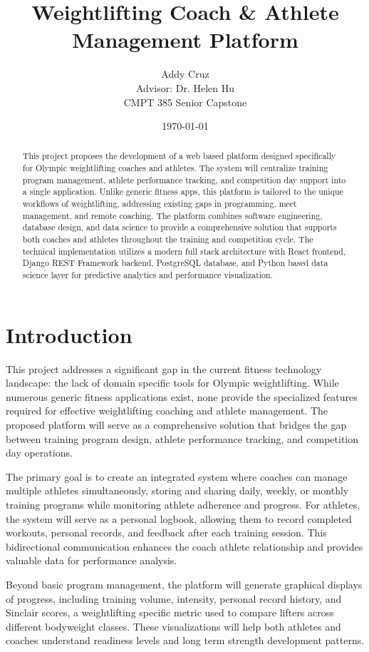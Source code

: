 \documentclass[11pt, oneside]{article}   	%
\title{Weightlifting Coach \& Athlete Management Platform}
\author{Addy Cruz \\ Advisor: Dr. Helen Hu \\ CMPT 385 Senior Capstone}
\date{\today}
\begin{document}
\maketitle

\begin{abstract}
\noindent
This project proposes the development of a web based platform designed specifically for Olympic weightlifting coaches and athletes. The system will centralize training program management, athlete performance tracking, and competition day support into a single application. Unlike generic fitness apps, this platform is tailored to the unique workflows of weightlifting, addressing existing gaps in programming, meet management, and remote coaching. The platform combines software engineering, database design, and data science to provide a comprehensive solution that supports both coaches and athletes throughout the training and competition cycle. The technical implementation utilizes a modern full stack architecture with React frontend, Django REST Framework backend, PostgreSQL database, and Python based data science layer for predictive analytics and performance visualization.
\end{abstract}

\section*{Introduction}

This project addresses a significant gap in the current fitness technology landscape: the lack of domain specific tools for Olympic weightlifting. While numerous generic fitness applications exist, none provide the specialized features required for effective weightlifting coaching and athlete management. The proposed platform will serve as a comprehensive solution that bridges the gap between training program design, athlete performance tracking, and competition day operations.

The primary goal is to create an integrated system where coaches can manage multiple athletes simultaneously, storing and sharing daily, weekly, or monthly training programs while monitoring athlete adherence and progress. For athletes, the system will serve as a personal logbook, allowing them to record completed workouts, personal records, and feedback after each training session. This bidirectional communication enhances the coach athlete relationship and provides valuable data for performance analysis.

Beyond basic program management, the platform will generate graphical displays of progress, including training volume, intensity, personal record history, and Sinclair scores, a weightlifting specific metric used to compare lifters across different bodyweight classes. These visualizations will help both athletes and coaches understand readiness levels and long term strength development patterns.
\end{document}
